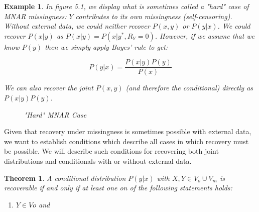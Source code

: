 \documentclass[12pt,twoside]{reedthesis}
\newtheorem{theorem}{Theorem}
\newtheorem{example}{Example}
\theoremstyle{definition}
\begin{document}
\begin{example}
In figure 5.1, we display what is sometimes called a "hard" case of MNAR missingness: $Y$ contributes to its own missingness (self-censoring). Without external data, we could neither recover $P(x,y)$ or $P(y|x)$. We could recover $P(x | y)$ as $P(x | y) = P(x | y^*, R_Y = 0)$. However, if we assume that we know $P(y)$ then we simply apply Bayes' rule to get:

$$P(y | x) = \frac{P(x|y)P(y)}{P(x)}$$

We can also recover the joint $P(x,y)$ (and therefore the conditional) directly as $P(x| y)P(y)$.
\begin{figure}
\centering
{}
\caption{"Hard" MNAR Case} \label{fig:MissingExternal}
\end{figure}
\end{example}

Given that recovery under missingness is sometimes possible with external data, we want to establish conditions which describe all cases in which recovery must be possible. We will describe such conditions for recovering both joint distributions and conditionals with or without external data.

 
\begin{theorem}
A conditional distribution $P(y | x)$ with $X, Y \in V_o \cup V_m$ is recoverable if and only if at least one on of the following statements holds:

\begin{enumerate}
\item $Y \in Vo$ and 
\end{enumerate}
\end{theorem}


\end{document}
